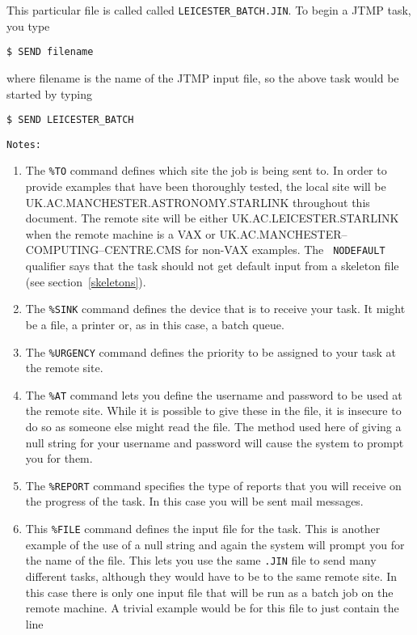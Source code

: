 This particular file is called called {\tt LEICESTER\_BATCH.JIN}. To begin a
JTMP task, you type

\begin{verbatim}
$ SEND filename
\end{verbatim}

where filename is the name of the JTMP input file, so the above task would be
started by typing

\begin{verbatim}
$ SEND LEICESTER_BATCH
\end{verbatim}

{\tt Notes:}

\begin{enumerate}

\item The {\tt \%TO} command defines which site the job is being sent to. In
order to provide examples that have been thoroughly tested, the local site will
be UK.AC.MANCHESTER.ASTRONOMY.STARLINK throughout this document. The remote site
will be either UK.AC.LEICESTER.STARLINK when the remote machine is a VAX or 
UK.AC.MANCHESTER--COMPUTING--CENTRE.CMS for non-VAX examples. The {\tt
NODEFAULT} qualifier says that the task should not get default input from a
skeleton file (see section~\ref{skeletons}).

\item The {\tt \%SINK} command defines the device that is to receive your task.
It might be  a file, a printer or, as in this case, a batch queue.

\item The {\tt \%URGENCY} command defines the priority to be assigned to your
task at the remote site.

\item The {\tt \%AT} command lets you define the username and password to be
used at the remote site. While it is possible to give these in the file, it is
insecure to do so as someone else might read the file. The method used here of
giving a null string for your username and password will cause the system to
prompt you for them.

\item The {\tt \%REPORT} command specifies the type of reports that you will
receive on the progress of the task. In this case you will be sent mail
messages.

\item This {\tt \%FILE} command defines the input file for the task. This is
another example of the use of a null string and again the system will prompt
you for the name of the file. This lets you use the same {\tt .JIN} file to
send many different tasks, although they would have to be to the same remote
site. In this case there is only one input file that will be run as a batch job
on the remote machine. A trivial example would be for this file to just contain
the line 


\end{enumerate}
